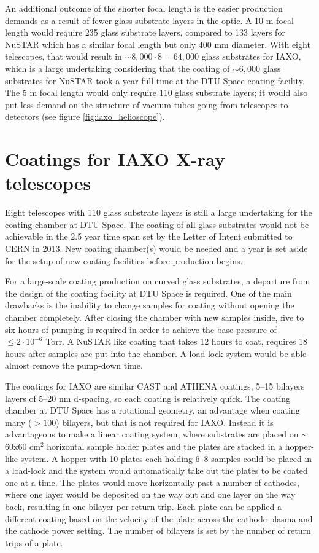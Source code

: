 An additional outcome of the shorter focal length is the easier production demands as a result of fewer glass substrate layers in the optic. A 10 m focal length would require 235 glass substrate layers, compared to 133 layers for NuSTAR which has a similar focal length but only 400 mm diameter. With eight telescopes, that would result in $\sim8,000\cdot8=64,000$ glass substrates for IAXO, which is a large undertaking considering that the coating of $\sim6,000$ glass substrates for NuSTAR took a year full time at the DTU Space coating facility. The 5 m focal length would only require 110 glass substrate layers; it would also put less demand on the structure of vacuum tubes going from telescopes to detectors (see figure \ref{fig:iaxo_helioscope}).

\section{Coatings for IAXO X-ray telescopes}
Eight telescopes with 110 glass substrate layers is still a large undertaking for the coating chamber at DTU Space. The coating of all glass substrates would not be achievable in the 2.5 year time span set by the Letter of Intent\cite{Irastorza:2013uu} submitted to CERN in 2013. New coating chamber(s) would be needed and a year is set aside for the setup of new coating facilities before production begins.

For a large-scale coating production on curved glass substrates, a departure from the design of the coating facility at DTU Space is required. One of the main drawbacks is the inability to change samples for coating without opening the chamber completely. After closing the chamber with new samples inside, five to six hours of pumping is required in order to achieve the base pressure of $\leq 2\cdot10^{-6}$ Torr. A NuSTAR like coating that takes 12 hours to coat, requires 18 hours after samples are put into the chamber. A load lock system would be able almost remove the pump-down time.

The coatings for IAXO are similar CAST and ATHENA coatings, 5--15 bilayers layers of 5--20 nm d-spacing, so each coating is relatively quick. The coating chamber at DTU Space has a rotational geometry, an advantage when coating many ($>100$) bilayers, but that is not required for IAXO. Instead it is advantageous to make a linear coating system, where substrates are placed on $\sim$60x60 cm$^2$ horizontal sample holder plates and the plates are stacked in a hopper-like system. A hopper with 10 plates each holding 6--8 samples could be placed in a load-lock and the system would automatically take out the plates to be coated one at a time. The plates would move horizontally past a number of cathodes, where one layer would be deposited on the way out and one layer on the way back, resulting in one bilayer per return trip. Each plate can be applied a different coating based on the velocity of the plate across the cathode plasma and the cathode power setting. The number of bilayers is set by the number of return trips of a plate.

